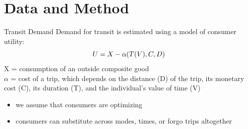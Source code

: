 \documentclass[newPxFont]{beamer}
\begin{document}
%
%

\section{Data and Method}
\begin{frame}[c]{Transit Demand}
Demand for transit is estimated using a model of consumer utility:\\
	\begin{equation}{\label{eq1}}
	U=X-\alpha(T(V),C,D)  
	\end{equation}
	X = consumption of an outside composite good\\
	$\alpha$ = cost of a trip, which depends on the distance (D) of the trip, its monetary cost (C), its duration (T), and the individual's value of time (V)\\
	
	\begin{itemize}
		\item{we assume that consumers are optimizing}
		\item{consumers can substitute across modes, times, or forgo trips altogether}
	\end{itemize}

\end{frame}
\end{document}
